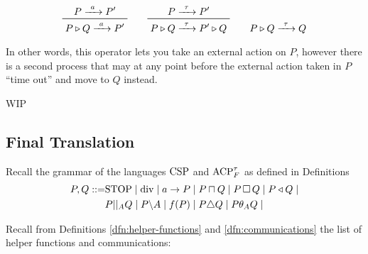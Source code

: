\documentclass[../hons_project.tex]{subfiles}
\begin{document}
\[\prftree{P \prightarrow{a} P'}{P \triangleright Q \prightarrow{a} P'} \qquad \prftree{P \prightarrow{\tau} P'}{P \triangleright Q \prightarrow{\tau} P' \triangleright Q} \qquad P \triangleright Q \prightarrow{\tau} Q\]

In other words, this operator lets you take an external action on $P$, however there is a second process that may at any point before the external action taken in $P$ ``time out'' and move to $Q$ instead.

	{\huge WIP}

\newpage
\subsection{Final Translation}

Recall the grammar of the languages $\mathrm{CSP}$ and $\mathrm{ACP}_{F}^{\tau}$ as defined in Definitions
\begin{align*}
	P, Q ::= & \mathrm{STOP} \mid \mathrm{div} \mid a\to P \mid P \sqcap Q \mid P \,\square\, Q \mid P \triangleleft Q \mid \\
	         & P | |_{A} Q \mid P \backslash A \mid f(P) \mid P \triangle Q \mid P \theta_{A} Q \mid
\end{align*}

Recall from Definitions \ref{dfn:helper-functions} and \ref{dfn:communications} the list of helper functions and communications:
\end{document}

